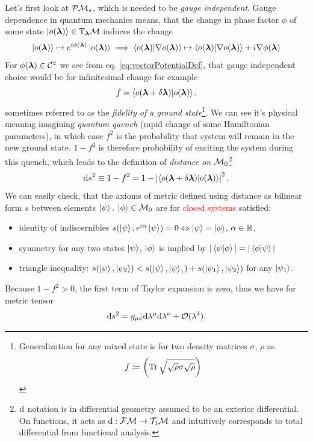 Let's first look at $\mathcal{P}\mathcal{M}_s$, which is needed to be \emph{gauge independent}. Gauge dependence in quantum mechanics means, that the change in phase factor $\phi$ of some state $\ket{o({\bm\lambda})}\in \mathbb{T}_{\bm\lambda}\mathcal{M}$ induces the change 
\begin{equation}
    \ket{o({\bm\lambda})}\mapsto e^{i\phi({\bm\lambda})} \ket{o({\bm\lambda})} \implies \braket{o({\bm\lambda})|\nabla o({\bm\lambda})}\mapsto \braket{o({\bm\lambda})|\nabla o({\bm\lambda})} + i\nabla \phi({\bm\lambda}) 
\end{equation} 
For $\phi({\bm\lambda})\in \mathcal C^2$ we see from eq. \ref{eq:vectorPotentialDef}, that gauge independent choice would be for infinitesimal change for example
\begin{equation}
    f=\braket{o(\bm{{\bm\lambda}}+\delta\bm{{\bm\lambda}})|o(\bm{{\bm\lambda}})},
\end{equation}
sometimes referred to as the \emph{fidelity of a ground state}\footnote{Generalization for any mixed state is for two density matrices $\sigma$, $\rho$ as $$f\coloneqq \left(\operatorname{\textrm{Tr}} \sqrt{\sqrt{\rho}\sigma\sqrt{\rho}}\right)$$}. We can see it's physical meaning imagining \emph{quantum quench} (rapid change of some Hamiltonian parameters), in which case $f^2$ is the probability that system will remain in the new ground state. $1-f^2$ is therefore probability of exciting the system during this quench, which leads to the definition of \emph{distance on $\mathcal{M}_0$}\footnote{$\mathrm{d}$ notation is in differential geometry assumed to be an exterior differential. On functions, it acts as $\mathrm{d}: \mathcal{F}\mathcal{M}\rightarrow \mathcal{T}_1\mathcal{M}$ and intuitively corresponds to total differential from functional analysis.}
\begin{equation}
    \mathrm{d} s^2 \equiv 1-f^2= 1-\left|\braket{o(\bm{{\bm\lambda}}+\delta\bm{{\bm\lambda}})|o(\bm{{\bm\lambda}})}\right|^2.
    \label{eq:distanceOnM0}
\end{equation}
We can easily check, that the axioms of metric defined using distance as bilinear form $s$ between elements $\ket{\psi},\; \ket{\phi}\in \mathcal{M}_0$ are for \textcolor{red}{closed systems} satisfied:
\begin{itemize}
    \item identity of indiscernibles $s(\ket{\psi},e^{i\alpha}\ket{\psi}) = 0 \Leftrightarrow \ket{\psi}=\ket{\phi}$, $\alpha\in\mathbb{R}$,
    \item symmetry for any two states $\ket{\psi}$, $\ket{\phi}$ is implied by $|\braket{\psi|\phi}|=|\braket{\phi|\psi}|$
    \item triangle inequality: $s(\ket{\psi},\ket{\psi_2}) <s(\ket{\psi},\ket{\psi}_1) + s(\ket{\psi_1},\ket{\psi_2})$ for any $\ket{\psi_1}$.
\end{itemize}
Because $1-f^2>0$, the first term of Taylor expansion is zero, thus we have for metric tensor
\begin{equation}
    \mathrm{d} s^2 = g_{\mu\nu}\mathrm{d} \lambda^\mu \mathrm{d}\lambda^\nu+\mathcal{O}(\lambda^3).
\end{equation} 

